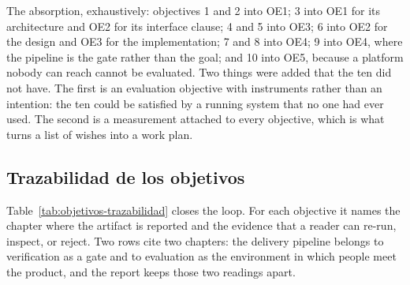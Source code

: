 The absorption, exhaustively: objectives 1 and 2 into OE1; 3 into OE1 for its
architecture and OE2 for its interface clause; 4 and 5 into OE3; 6 into OE2 for the
design and OE3 for the implementation; 7 and 8 into OE4; 9 into OE4, where the
pipeline is the gate rather than the goal; and 10 into OE5, because a platform
nobody can reach cannot be evaluated. Two things were
added that the ten did not have. The first is an evaluation objective with
instruments rather than an intention: the ten could be satisfied by a running
system that no one had ever used. The second is a measurement attached to every
objective, which is what turns a list of wishes into a work plan.

\subsection{Trazabilidad de los objetivos}

Table~\ref{tab:objetivos-trazabilidad} closes the loop. For each objective it names
the chapter where the artifact is reported and the evidence that a reader can
re-run, inspect, or reject. Two rows cite two chapters: the delivery pipeline
belongs to verification as a gate and to evaluation as the environment in which
people meet the product, and the report keeps those two readings apart.

